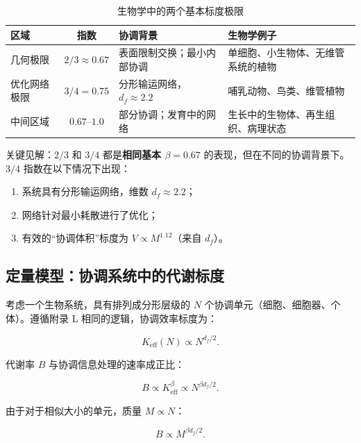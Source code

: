\documentclass[12pt]{article}
\newcommand{\Keff}{K_{\mathrm{eff}}}
\begin{document}
	\begin{table}[htbp]
		\centering
		\caption{生物学中的两个基本标度极限}
		\label{tab:scaling-limits}
		\begin{tabular}{p{3.5cm}c p{6cm} p{5cm}}
			\toprule
			\textbf{区域} & \textbf{指数} & \textbf{协调背景} & \textbf{生物学例子} \\
			\midrule
			几何极限 & \(2/3 \approx 0.67\) & 表面限制交换；最小内部协调 & 单细胞、小生物体、无维管系统的植物 \cite{Glazier2005,Reich2006} \\
			优化网络极限 & \(3/4 = 0.75\) & 分形输运网络，\(d_f \approx 2.2\) & 哺乳动物、鸟类、维管植物 \cite{West1997} \\
			中间区域 & \(0.67\)–\(1.0\) & 部分协调；发育中的网络 & 生长中的生物体、再生组织、病理状态 \cite{Glazier2005} \\
			\bottomrule
		\end{tabular}
	\end{table}
	
	关键见解：\(2/3\) 和 \(3/4\) 都是\textbf{相同基本 \(\beta = 0.67\)} 的表现，但在不同的协调背景下。\(3/4\) 指数在以下情况下出现：
	\begin{enumerate}
		\item 系统具有分形输运网络，维数 \(d_f \approx 2.2\)；
		\item 网络针对最小耗散进行了优化；
		\item 有效的“协调体积”标度为 \(V \propto M^{1.12}\)（来自 \(d_f\)）。
	\end{enumerate}
	
	\subsection{定量模型：协调系统中的代谢标度}
	
	考虑一个生物系统，具有排列成分形层级的 \(N\) 个协调单元（细胞、细胞器、个体）。遵循附录 L 相同的逻辑，协调效率标度为：
	
	\begin{equation}
		\Keff(N) \propto N^{d_f/2}.
	\end{equation}
	
	代谢率 \(B\) 与协调信息处理的速率成正比：
	
	\begin{equation}
		B \propto \Keff^{\beta} \propto N^{\beta d_f/2}.
	\end{equation}
	
	由于对于相似大小的单元，质量 \(M \propto N\)：
	
	\begin{equation}
		B \propto M^{\beta d_f/2}.
	\end{equation}
	
\end{document}
